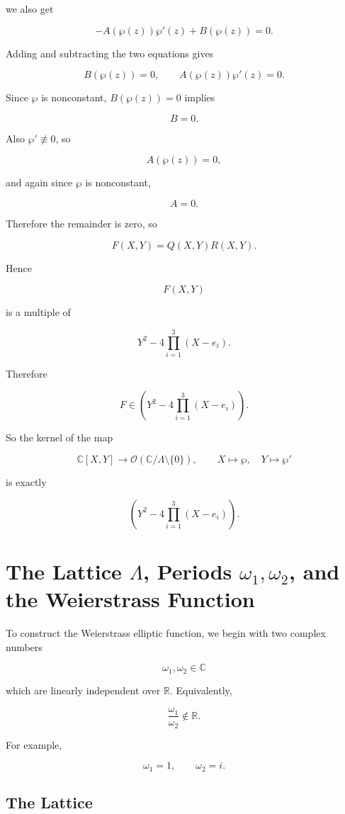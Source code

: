 \documentclass[12pt,a4paper]{article}
\theoremstyle{notespace}
\begin{document}
we also get

\[
-A(\wp(z))\wp'(z)+B(\wp(z))=0.
\]

Adding and subtracting the two equations gives

\[
B(\wp(z))=0,
\qquad
A(\wp(z))\wp'(z)=0.
\]

Since \(\wp\) is nonconstant, \(B(\wp(z))=0\) implies

\[
B=0.
\]

Also \(\wp'\not\equiv 0\), so

\[
A(\wp(z))=0,
\]

and again since \(\wp\) is nonconstant,

\[
A=0.
\]

Therefore the remainder is zero, so

\[
F(X,Y)=Q(X,Y)R(X,Y).
\]

Hence

\[
F(X,Y)
\]

is a multiple of

\[
Y^2-4\prod_{i=1}^3(X-e_i).
\]

Therefore

\[
\boxed{
	F\in
	\left(
	Y^2-4\prod_{i=1}^3(X-e_i)
	\right).
}
\]

So the kernel of the map

\[
\mathbb C[X,Y]\longrightarrow \mathcal O(\mathbb C/\Lambda\setminus\{0\}),
\qquad
X\mapsto \wp,
\quad
Y\mapsto \wp'
\]

is exactly

\[
\boxed{
	\left(
	Y^2-4\prod_{i=1}^3(X-e_i)
	\right).
}
\]
	
\section{The Lattice \(\Lambda\), Periods \(\omega_1,\omega_2\), and the Weierstrass Function}

To construct the Weierstrass elliptic function, we begin with two complex numbers

\[
\omega_1,\omega_2\in\mathbb C
\]

which are linearly independent over \(\mathbb R\). Equivalently,

\[
\frac{\omega_1}{\omega_2}\notin\mathbb R.
\]

For example,

\[
\omega_1=1,
\qquad
\omega_2=i.
\]

\subsection{The Lattice}
\end{document}
